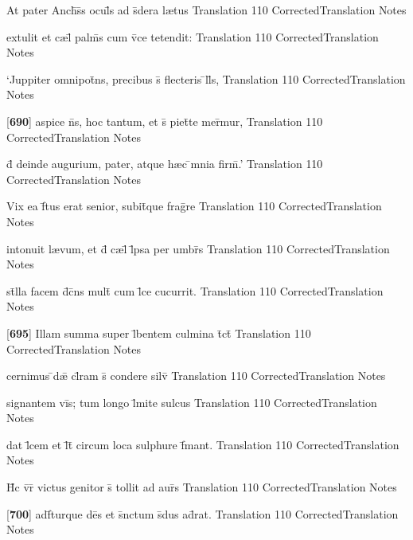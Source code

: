 \latline
  {At pater Anch\={\macron {\i}}s\={}s ocul\={}s ad s\={\macron {\i}}dera l{\ae}tus}
  { Translation }
  {110}
  { CorrectedTranslation }
  { Notes }


\latline
  {extulit et c{\ae}l\={} palm\={}s cum v\={}ce tetendit:}
  { Translation }
  {110}
  { CorrectedTranslation }
  { Notes }


\latline
  {`Juppiter omnipot\={}ns, precibus s\={\macron {\i}} flecteris \={}ll\={\macron {\i}}s,}
  { Translation }
  {110}
  { CorrectedTranslation }
  { Notes }


\latline
  {[\textbf{690}] aspice n\={}s, hoc tantum, et s\={\macron {\i}} piet\={}te mer\={}mur,}
  { Translation }
  {110}
  { CorrectedTranslation }
  { Notes }


\latline
  {d\={} deinde augurium, pater, atque h{\ae}c \={}mnia firm\={}.'}
  { Translation }
  {110}
  { CorrectedTranslation }
  { Notes }


\latline
  {Vix ea f\={}tus erat senior, subit\={}que frag\={}re}
  { Translation }
  {110}
  { CorrectedTranslation }
  { Notes }


\latline
  {intonuit l{\ae}vum, et d\={} c{\ae}l\={} l\={}psa per umbr\={}s}
  { Translation }
  {110}
  { CorrectedTranslation }
  { Notes }


\latline
  {st\={}lla facem d\={}c\={}ns mult\={} cum l\={}ce cucurrit.}
  { Translation }
  {110}
  { CorrectedTranslation }
  { Notes }


\latline
  {[\textbf{695}] Illam summa super l\={}bentem culmina t\={}ct\={\macron {\i}}}
  { Translation }
  {110}
  { CorrectedTranslation }
  { Notes }


\latline
  {cernimus \={}d{\ae}\={} cl\={}ram s\={} condere silv\={}}
  { Translation }
  {110}
  { CorrectedTranslation }
  { Notes }


\latline
  {signantem vi\={}s; tum longo l\={\macron {\i}}mite sulcus}
  { Translation }
  {110}
  { CorrectedTranslation }
  { Notes }


\latline
  {dat l\={}cem et l\={}t\={} circum loca sulphure f\={}mant.}
  { Translation }
  {110}
  { CorrectedTranslation }
  { Notes }


\latline
  {H\={\macron {\i}}c v\={}r\={} victus genitor s\={} tollit ad aur\={}s}
  { Translation }
  {110}
  { CorrectedTranslation }
  { Notes }


\latline
  {[\textbf{700}] adf\={}turque de\={}s et s\={}nctum s\={\macron {\i}}dus ad\={}rat.}
  { Translation }
  {110}
  { CorrectedTranslation }
  { Notes }



